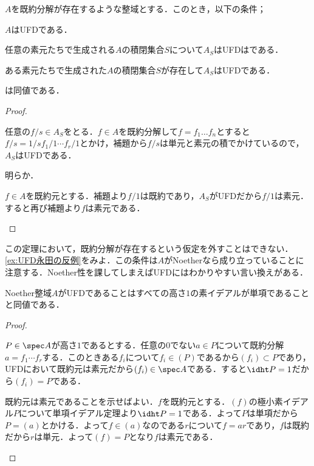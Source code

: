 \begin{thm}[永田の判定条件]\label{thm:UFDnagata}
	$A$を既約分解が存在するような整域とする．このとき，以下の条件；
	\begin{sakura}
		\item $A$はUFDである．
		\item 任意の素元たちで生成される$A$の積閉集合$S$について$A_S$はUFDはである．
		\item ある素元たちで生成された$A$の積閉集合$S$が存在して$A_S$はUFDである．
	\end{sakura}
	は同値である．
\end{thm}

\begin{proof}
	\begin{eqv}[3]
		\item 任意の$f/s\in A_S$をとる．$f\in A$を既約分解して$f=f_1\dots f_n$とすると$f/s=1/s f_1/1 \cdots f_r/1$とかけ，補題から$f/s$は単元と素元の積でかけているので，$A_S$はUFDである．
		\item 明らか．
		\item $f\in A$を既約元とする．補題より$f/1$は既約であり，$A_S$がUFDだから$f/1$は素元．すると再び補題より$f$は素元である．
	\end{eqv}
\end{proof}

この定理において，既約分解が存在するという仮定を外すことはできない．\ref{ex:UFD永田の反例}をみよ．この条件は$A$がNoetherなら成り立っていることに注意する．Noether性を課してしまえばUFDにはわかりやすい言い換えがある．

\begin{prop}
	Noether整域$A$がUFDであることはすべての高さ$1$の素イデアルが単項であることと同値である．
\end{prop}

\begin{proof}
	\begin{eqv}
		\item $P\in\spec A$が高さ$1$であるとする．任意の$0$でない$a\in P$について既約分解$a=f_1\cdots f_r$する．このときある$f_i$について$f_i\in (P)$であるから$(f_i)\subset P$であり，UFDにおいて既約元は素元だから$(f_i)\in\spec A$である．すると$\idht P=1$だから$(f_i)=P$である．
		\item 既約元は素元であることを示せばよい．$f$を既約元とする．$(f)$の極小素イデアル$P$について単項イデアル定理より$\idht P=1$である．よって$P$は単項だから$P=(a)$とかける．よって$f\in (a)$なのである$r$について$f=ar$であり，$f$は既約だから$r$は単元．よって$(f)=P$となり$f$は素元である．
	\end{eqv}
\end{proof}

